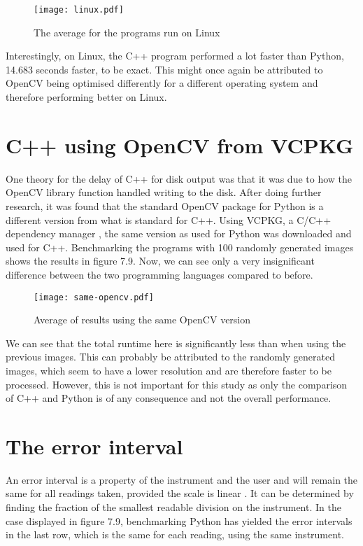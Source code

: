 \begin{figure}[H]
	\centering
	\texttt{[image: linux.pdf]}
	\caption{The average for the programs run on Linux}
	\label{figure:linux}
\end{figure}

Interestingly, on Linux, the C++ program performed a lot faster than Python, 14.683 seconds faster, to be exact. This might once again be attributed to OpenCV being optimised differently for a different operating system and therefore performing better on Linux.

\section{C++ using OpenCV from VCPKG}
One theory for the delay of C++ for disk output was that it was due to how the OpenCV library function handled writing to the disk. After doing further research, it was found that the standard OpenCV package for Python is a different version from what is standard for C++. Using VCPKG, a C/C++ dependency manager \cite{vcpkg}, the same version as used for Python was downloaded and used for C++. Benchmarking the programs with 100 randomly generated images shows the results in figure 7.9. Now, we can see only a very insignificant difference between the two programming languages compared to before.

\begin{figure}[H]
	\centering
	\texttt{[image: same-opencv.pdf]}
	\caption{Average of results using the same OpenCV version}
	\label{figure:same-opencv}
\end{figure}

We can see that the total runtime here is significantly less than when using the previous images. This can probably be attributed to the randomly generated images, which seem to have a lower resolution and are therefore faster to be processed. However, this is not important for this study as only the comparison of C++ and Python is of any consequence and not the overall performance.

\section{The error interval}
An error interval is a property of the instrument and the user and will remain the same for all readings taken, provided the scale is linear \cite{errorinterval}. It can be determined by finding the fraction of the smallest readable division on the instrument. In the case displayed in figure 7.9, benchmarking Python has yielded the error intervals in the last row, which is the same for each reading, using the same instrument.

